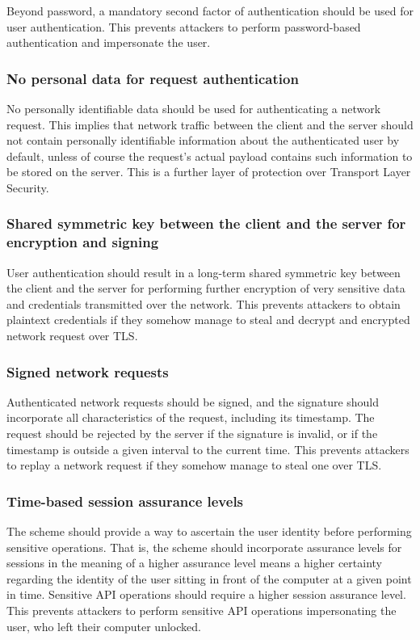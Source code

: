 Beyond password, a mandatory second factor of authentication should be used for user authentication. This prevents attackers to perform password-based authentication and impersonate the user.

\subsubsection{No personal data for request authentication}

No personally identifiable data should be used for authenticating a network request. This implies that network traffic between the client and the server should not contain personally identifiable information about the authenticated user by default, unless of course the request's actual payload contains such information to be stored on the server. This is a further layer of protection over Transport Layer Security.

\subsubsection{Shared symmetric key between the client and the server for encryption and signing}

User authentication should result in a long-term shared symmetric key between the client and the server for performing further encryption of very sensitive data and credentials transmitted over the network. This prevents attackers to obtain plaintext credentials if they somehow manage to steal and decrypt and encrypted network request over TLS.

\subsubsection{Signed network requests}

Authenticated network requests should be signed, and the signature should incorporate all characteristics of the request, including its timestamp. The request should be rejected by the server if the signature is invalid, or if the timestamp is outside a given interval to the current time. This prevents attackers to replay a network request if they somehow manage to steal one over TLS.

\subsubsection{Time-based session assurance levels}

The scheme should provide a way to ascertain the user identity before performing sensitive operations. That is, the scheme should incorporate assurance levels for sessions in the meaning of a higher assurance level means a higher certainty regarding the identity of the user sitting in front of the computer at a given point in time. Sensitive API operations should require a higher session assurance level. This prevents attackers to perform sensitive API operations impersonating the user, who left their computer unlocked.

